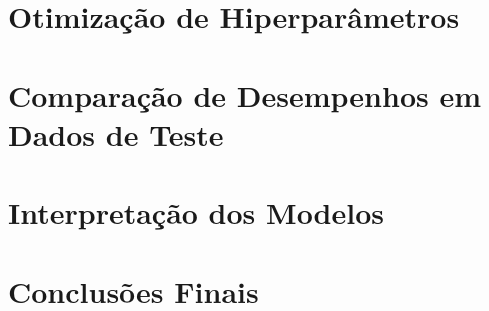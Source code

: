 \documentclass{report}
\let\oldsection\section
\renewcommand\section{\clearpage\oldsection}
\begin{document}
\section{Otimização de Hiperparâmetros}

\section{Comparação de Desempenhos em Dados de Teste}

\section{Interpretação dos Modelos}

\section{Conclusões Finais}

\clearpage
\printbibliography
\thispagestyle{empty}
\end{document}
